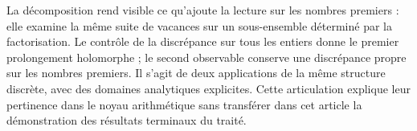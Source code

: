 La décomposition rend visible ce qu'ajoute la lecture sur les nombres premiers : elle examine
la même suite de vacances sur un sous-ensemble déterminé par la
factorisation. Le contrôle de la discrépance sur tous les entiers donne
le premier prolongement holomorphe ; le second observable conserve une
discrépance propre sur les nombres premiers. Il s'agit de deux applications de la même
structure discrète, avec des domaines analytiques explicites. Cette articulation
explique leur pertinence dans le noyau arithmétique sans transférer dans cet
article la démonstration des résultats terminaux du traité.


